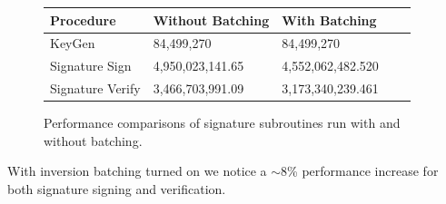 \begin{figure}
\begin{center}
\begin{tabular}{@{}lllll@{}}
	\toprule
	Procedure & Without Batching & With Batching\\
	\midrule
	KeyGen & 84,499,270 & 84,499,270\\
	Signature Sign & 4,950,023,141.65 & 4,552,062,482.520\\
	Signature Verify & 3,466,703,991.09 & 3,173,340,239.461\\
	\bottomrule
\end{tabular}
\end{center}
\caption{Performance comparisons of signature subroutines run with and without batching.}
\label{fig:batchgains}
\end{figure}

With inversion batching turned on we notice a ${\sim}8$\% performance increase for both signature signing and verification.\\
